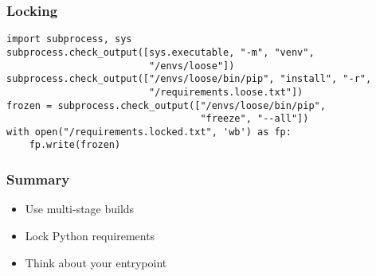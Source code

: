 \documentclass{beamer}
\begin{document}
\begin{frame}[fragile]
\frametitle{Locking}
\begin{lstlisting}
import subprocess, sys
subprocess.check_output([sys.executable, "-m", "venv",
                         "/envs/loose"])
subprocess.check_output(["/envs/loose/bin/pip", "install", "-r",
                         "/requirements.loose.txt"])
frozen = subprocess.check_output(["/envs/loose/bin/pip",
                                  "freeze", "--all"])
with open("/requirements.locked.txt", 'wb') as fp:
    fp.write(frozen)
\end{lstlisting}
\end{frame}

\begin{frame}
\frametitle{Summary}
\begin{itemize}
\item Use multi-stage builds \pause
\item Lock Python requirements \pause
\item Think about your entrypoint
\end{itemize}
\end{frame}
\end{document}
